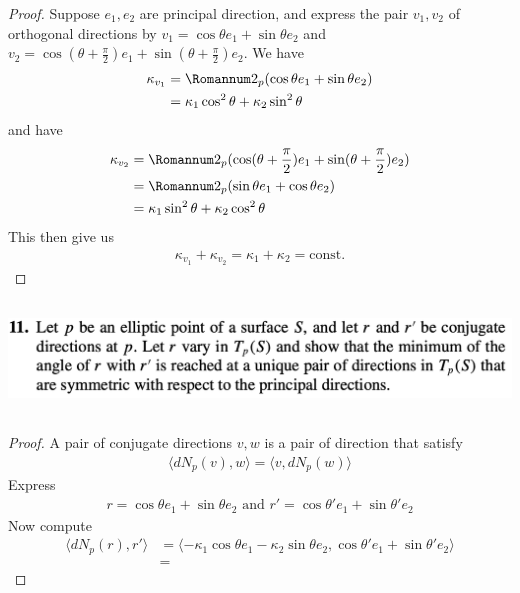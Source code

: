 \documentclass{report}
\begin{document}
\begin{proof}
Suppose $e_1,e_2$ are principal direction, and express the pair $v_1,v_2$ of orthogonal directions by  $v_1=\cos \theta e_1+ \sin \theta e_2$ and $v_2=\cos (\theta + \frac{\pi}{2}) e_1+ \sin (\theta + \frac{\pi}{2}) e_2$. We have 
\begin{align*}
\kappa_{v_1}&=\Sec_p (\cos \theta e_1+\sin \theta e_2)\\
&=\kappa_1 \cos^2 \theta + \kappa_2 \sin^2 \theta
\end{align*}
and have 
\begin{align*}
\kappa_{v_2}&=\Sec_p(\cos (\theta + \frac{\pi}{2})e_1+ \sin (\theta + \frac{\pi}{2})e_2)\\
&=\Sec_p (\sin \theta e_1+\cos \theta e_2)\\
&=\kappa_1 \sin^2 \theta + \kappa_2\cos^2 \theta 
\end{align*}
This then give us 
\begin{align*}
\kappa_{v_1}+\kappa_{v_2}= \kappa_1+ \kappa_2=\text{const.}
\end{align*}
\end{proof}

\begin{question}{}{}
\includegraphics[height=3cm,width=18cm]{hw5q5}
\end{question}
\begin{proof}
A pair of conjugate directions $v,w$ is a pair of direction that satisfy 
\begin{align*}
\langle dN_p(v),w\rangle = \langle v,dN_p(w)\rangle 
\end{align*}
Express 
\begin{align*}
r=\cos \theta e_1+ \sin \theta e_2\text{ and }r'=\cos \theta' e_1+ \sin \theta' e_2
\end{align*}
Now compute 
\begin{align*}
\langle dN_p(r),r'\rangle &= \langle -\kappa_1 \cos \theta e_1- \kappa_2 \sin \theta e_2, \cos \theta ' e_1+ \sin \theta' e_2 \rangle \\
&=
\end{align*}




\end{proof}
\end{document}
